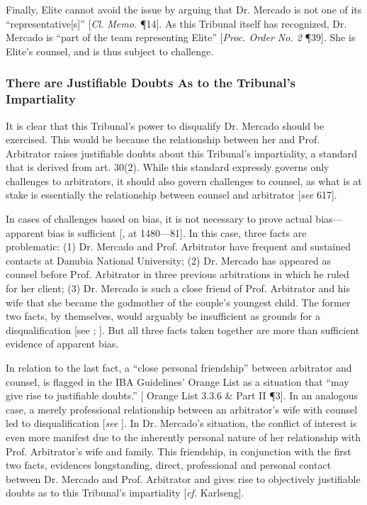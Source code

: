Finally, Elite cannot avoid the issue by arguing that Dr. Mercado is not one of its ``representative[s]'' [\textit{Cl. Memo.} \P 14]. As this Tribunal itself has recognized, Dr. Mercado is ``part of the team representing Elite'' [\textit{Proc. Order No. 2} \P 39]. She is Elite's counsel, and is thus subject to challenge.

\subsubsection{There are Justifiable Doubts As to the Tribunal's \\ Impartiality}

It is clear that this Tribunal's power to disqualify Dr. Mercado should be exercised. This would be because the relationship between her and Prof. Arbitrator raises justifiable doubts about this Tribunal's impartiality, a standard that is derived from \cite{CIETAC Rules} art. 30(2). While this standard expressly governs only challenges to arbitrators, it should also govern challenges to counsel, as what is at stake is essentially the relationship between counsel and arbitrator [\textit{see} \cite{Waincymer} {617}].

In cases of challenges based on bias, it is not necessary to prove actual bias---apparent bias is sufficient [\cite{Born 2009}, at 1480–--81]. In this case, three facts are problematic: (1) Dr. Mercado and Prof. Arbitrator have frequent and sustained contacts at Danubia National University; (2) Dr. Mercado has appeared as counsel before Prof. Arbitrator in three previous arbitrations in which he ruled for her client; (3) Dr. Mercado is such a close friend of Prof. Arbitrator and his wife that she became the godmother of the couple's youngest child. The former two facts, by themselves, would arguably be insufficient as grounds for a disqualification [see \cite{Hunt}; \cite{Suez}]. But all three facts taken together are more than sufficient evidence of apparent bias.

In relation to the last fact, a ``close personal friendship'' between arbitrator and counsel, is flagged in the IBA Guidelines' Orange List as a situation that ``may give rise to justifiable doubts.'' [\cite{IBA Guidelines} Orange List 3.3.6 & Part II \P3]. In an analogous case, a merely professional relationship between an arbitrator's wife with counsel led to disqualification [\textit{see} \cite{Centrozap}]. In Dr. Mercado's situation, the conflict of interest is even more manifest due to the inherently personal nature of her relationship with Prof. Arbitrator's wife and family. This friendship, in conjunction with the first two facts, evidences longstanding, direct, professional and personal contact between Dr. Mercado and Prof. Arbitrator and gives rise to objectively justifiable doubts as to this Tribunal's impartiality [\textit{cf.} Karlseng].

